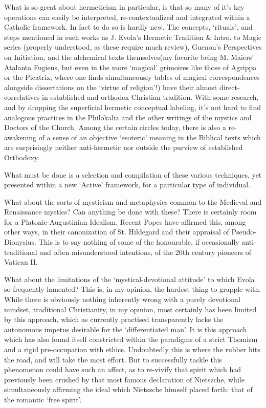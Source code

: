 \begin{footnotesize}
\begin{sffamily}
What is so great about hermeticism in particular, is that so many of it's key operations can easily be
interpreted, re-contextualized and integrated within a Catholic framework. In fact to do so is hardly new. The
concepts, `rituals’, and steps mentioned in such works as J. Evola's Hermetic
Tradition \& Intro. to Magic series (properly understood, as these require much review), Guenon's
Perspectives on Initiation, and the alchemical texts themselves(my favorite being M. Maiers' Atalanta
Fugiens, but even in the more `magical' grimoires like those of Agrippa or the Picatrix, where
one finds simultaneously tables of magical correspondences alongside dissertations on the `virtue of
religion’!) have their almost direct-correlatives in established and orthodox Christian tradition. With
some research, and by dropping the superficial hermetic conceptual labeling, it's not hard to find
analogous practices in the Philokalia and the other writings of the mystics and Doctors of the Church. Among the
certain circles today, there is also a re-awakening of a sense of an objective `esoteric’ meaning in the Biblical texts which are surprisingly neither anti-hermetic nor outside the purview of established
Orthodoxy.

What must be done is a selection and compilation of these various techniques, yet presented within a new
`Active' framework, for a particular type of individual.

What about the sorts of mysticism and metaphysics common to the Medieval and Renaissance mystics? Can anything be done
with these? There is certainly room for a Platonic-Augustinian Idealism. Recent Popes have affirmed this, among other
ways, in their canonization of St. Hildegard and their appraisal of Pseudo-Dionysius. This is to say nothing of some of
the honourable, if occasionally anti-traditional and often misunderstood intentions, of the 20th century pioneers of
Vatican II.

What about the limitations of the `mystical-devotional attitude' to which Evola so frequently
lamented? This is, in my opinion, the hardest thing to grapple with. While there is obviously nothing inherently wrong
with a purely devotional mindset, traditional Christianity, in my opinion, most certainly has been limited by this
approach, which as currently practised transparently lacks the autonomous impetus desirable for the
`differentiated man’. It is this approach which has also found itself constricted within the
paradigms of a strict Thomism and a rigid pre-occupation with ethics. Undoubtedly this is where the rubber hits the
road, and will take the most effort. But to successfully tackle this phenomenon could have such an affect, as to
re-vivify that spirit which had previously been crushed by that most famous declaration of Nietszche, while
simultaneously affirming the ideal which Nietszche himself placed forth: that of the romantic `free
spirit’.


\end{sffamily}
\end{footnotesize}
